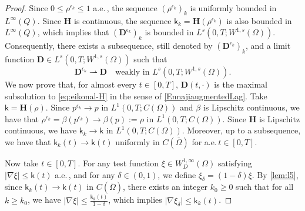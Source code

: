 \documentclass[final,reqno]{amsart}
\theoremstyle{plain}
\theoremstyle{definition}
\theoremstyle{remark}
\numberwithin{remark}{section}	%
\numberwithin{example}{section}	%
\newcommand{\de}{\mathbf{D}}
\newcommand{\he}{\mathbf{H}}
\newcommand{\Om}{\Omega}
\newcommand{\pp}{a.e.\,}
\newcommand{\kk}{\mathsf{k}}
\begin{document}
\begin{proof}
    Since $0\leq \rho^{\epsilon_k}\leq 1$ \pp, the sequence $(\rho^{\epsilon_k})_{k}$ is uniformly bounded in $L^{\infty}(Q)$. Since $\he$ is continuous, the sequence $\kk_k = \he(\rho^{\epsilon_k})$ is also bounded in $L^{\infty}(Q)$, which implies that $(\de^{\epsilon_k})_{k}$ is bounded in $L^{s}(0,T; W^{1,s}(\Omega))$. Consequently, there exists a subsequence, still denoted by $(\de^{\epsilon_k})_{k}$, and a limit function $\de \in L^{s}(0,T; W^{1,s}(\Omega))$ such that
    \begin{equation}\label{eq:weak-de}
        \de^{\epsilon_k} \rightharpoonup \de \quad \text{weakly in } L^s(0,T; W^{1,s}(\Omega)).
    \end{equation}
    We now prove that, for almost every $t \in [0,T]$, $\de(t, \cdot)$ is the maximal subsolution to \eqref{eq:eikonal-H} in the sense of \cref{EnnajiaugmentedLag}. Take $\kk = \he(\rho)$. Since $p^{\epsilon_k} \to p$ in $L^1(0,T; C(\Omega))$ and $\beta$ is Lipschitz continuous, we have that $\rho^{\epsilon_k} =\beta(p^{\epsilon_k}) \to \beta(p):=\rho$ in $L^1(0,T; C(\Omega))$. Since $\he$ is Lipschitz continuous, we have $\kk_k \to \kk$ in $L^1(0,T; C(\Omega))$. Moreover, up to a subsequence, we have that $\kk_k(t) \to \kk(t)$ uniformly in $C(\overline{\Omega})$ for \pp $t \in [0,T]$.

    Now take $t\in [0,T]$. For any test function $\xi \in W^{1,\infty}_D(\Om)$ satisfying $\vert\nabla \xi\vert \le \kk(t)$ \pp, and for any $\delta \in (0,1)$, we define $\xi_\delta = (1-\delta) \xi$. By \cref{lem:l5}, since $\kk_k(t) \to \kk(t)$ in $C(\overline{\Omega})$, there exists an integer $k_0 \ge 0$ such that for all $k \ge k_0$, we have $\vert\nabla \xi\vert \le \frac{\kk_k(t)}{1-\delta}$, which implies $\vert\nabla \xi_\delta\vert \le \kk_k(t)$.


\end{proof}
\end{document}
